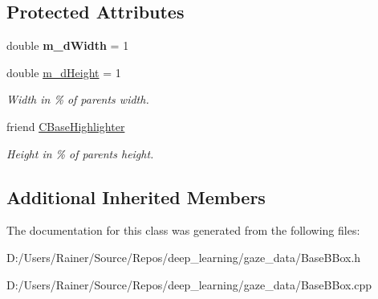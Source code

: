 \subsection*{Protected Attributes}
\begin{DoxyCompactItemize}
\item 
\mbox{\label{class_c_base_b_box_abc694b352766ffc4902c4fd2b8cc978a}} 
double {\bfseries m\+\_\+d\+Width} = 1
\item 
\mbox{\label{class_c_base_b_box_a24ab993e6da60fa3a1d67f21a2784e86}} 
double \hyperlink{class_c_base_b_box_a24ab993e6da60fa3a1d67f21a2784e86}{m\+\_\+d\+Height} = 1
\begin{DoxyCompactList}\small\item\em Width in \% of parent\textquotesingle{}s width. \end{DoxyCompactList}\item 
\mbox{\label{class_c_base_b_box_a7c5d97459f753e92bfa34497294683f4}} 
friend \hyperlink{class_c_base_b_box_a7c5d97459f753e92bfa34497294683f4}{C\+Base\+Highlighter}
\begin{DoxyCompactList}\small\item\em Height in \% of parent\textquotesingle{}s height. \end{DoxyCompactList}\end{DoxyCompactItemize}
\subsection*{Additional Inherited Members}


The documentation for this class was generated from the following files\+:\begin{DoxyCompactItemize}
\item 
D\+:/\+Users/\+Rainer/\+Source/\+Repos/deep\+\_\+learning/gaze\+\_\+data/Base\+B\+Box.\+h\item 
D\+:/\+Users/\+Rainer/\+Source/\+Repos/deep\+\_\+learning/gaze\+\_\+data/Base\+B\+Box.\+cpp\end{DoxyCompactItemize}
